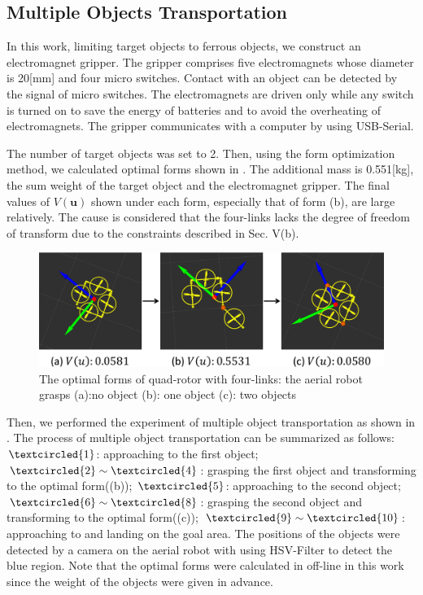 \subsection{Multiple Objects Transportation}
In this work, limiting target objects to ferrous objects, we construct an electromagnet gripper. The gripper comprises five electromagnets whose diameter is 20[mm] and four micro switches. Contact with an object can be detected by the signal of micro switches. The electromagnets are driven only while any switch is turned on to save the energy of batteries and to avoid the overheating of electromagnets. The gripper communicates with a computer by using USB-Serial.
\par
The number of target objects was set to 2. Then, using the form optimization method, we calculated optimal forms shown in . The additional mass is 0.551[kg], the sum weight of the target object and the electromagnet gripper. The final values of $V(\bm{u})$ shown under each form, especially that of form (b), are large relatively. The cause is considered that the four-links lacks the degree of freedom of transform due to the constraints described in Sec. V(b).
\samepage 
\begin{figure}[th]
  \begin{center}
    \includegraphics[width=1.0\columnwidth]{figs/quad_state.pdf}
  \end{center}
  \caption{The optimal forms of quad-rotor with four-links: the aerial robot grasps (a):no object (b): one object (c): two objects\label{figure:quad_state}}
\end{figure}
\par
Then, we performed the experiment of multiple object transportation as shown in . The process of multiple object transportation can be summarized as follows: $\textcircled{\scriptsize 1}$: approaching to the first object; $\textcircled{\scriptsize 2}\sim \textcircled{\scriptsize 4}$: grasping the first object and transforming to the optimal form((b)); $\textcircled{\scriptsize 5}$: approaching to the second object; $\textcircled{\scriptsize 6}\sim \textcircled{\scriptsize 8}$: grasping the second object and transforming to the optimal form((c)); $\textcircled{\scriptsize 9}\sim \textcircled{\scriptsize 10}$: approaching to and landing on the goal area. The positions of the objects were detected by a camera on the aerial robot with using HSV-Filter to detect the blue region. Note that the optimal forms were calculated in off-line in this work since the weight of the objects were given in advance.
